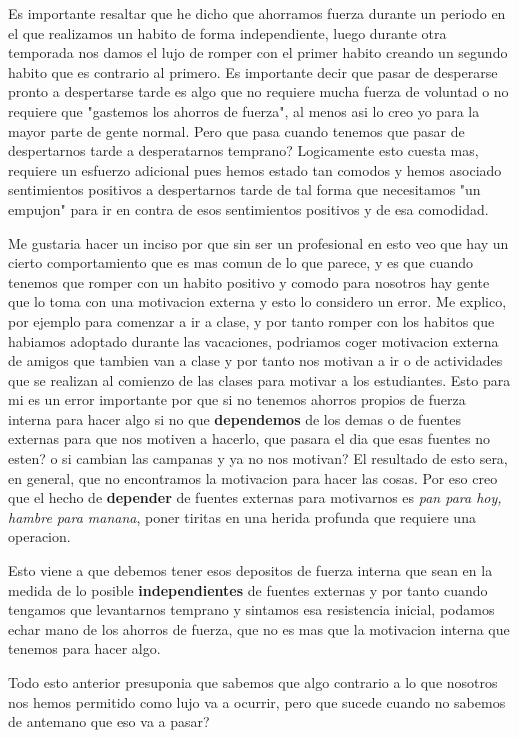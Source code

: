 Es importante resaltar que he dicho que ahorramos fuerza durante un periodo en el que realizamos un habito de forma independiente, luego durante otra temporada nos damos el lujo de romper con el primer habito creando un segundo habito que es contrario al primero. Es importante decir que pasar de desperarse pronto a despertarse tarde es algo que no requiere mucha fuerza de voluntad o no requiere que "gastemos los ahorros de fuerza", al menos asi lo creo yo para la mayor parte de gente normal. Pero que pasa cuando tenemos que pasar de despertarnos tarde a desperatarnos temprano? Logicamente esto cuesta mas, requiere un esfuerzo adicional pues hemos estado tan comodos y hemos asociado sentimientos positivos a despertarnos tarde de tal forma que necesitamos "un empujon" para ir en contra de esos sentimientos positivos y de esa comodidad. 

Me gustaria hacer un inciso por que sin ser un profesional en esto veo que hay un cierto comportamiento que es mas comun de lo que parece, y es que cuando tenemos que romper con un habito positivo y comodo para nosotros hay gente que lo toma con una motivacion externa y esto lo considero un error. Me explico, por ejemplo para comenzar a ir a clase, y por tanto romper con los habitos que habiamos adoptado durante las vacaciones, podriamos coger motivacion externa de amigos que tambien van a clase y por tanto nos motivan a ir o de actividades que se realizan al comienzo de las clases para motivar a los estudiantes. Esto para mi es un error importante por que si no tenemos ahorros propios de fuerza interna para hacer algo si no que \textbf{dependemos} de los demas o de fuentes externas para que nos motiven a hacerlo, que pasara el dia que esas fuentes no esten? o si cambian las campanas y ya no nos motivan? El resultado de esto sera, en general, que no encontramos la motivacion para hacer las cosas. Por eso creo que el hecho de \textbf{depender} de fuentes externas para motivarnos es \textit{pan para hoy, hambre para manana}, poner tiritas en una herida profunda que requiere una operacion.

Esto viene a que debemos tener esos depositos de fuerza interna que sean en la medida de lo posible \textbf{independientes} de fuentes externas y por tanto cuando tengamos que levantarnos temprano y sintamos esa resistencia inicial, podamos echar mano de los ahorros de fuerza, que no es mas que la motivacion interna que tenemos para hacer algo. 

Todo esto anterior presuponia que sabemos que algo contrario a lo que nosotros nos hemos permitido como lujo va a ocurrir, pero que sucede cuando no sabemos de antemano que eso va a pasar? 

